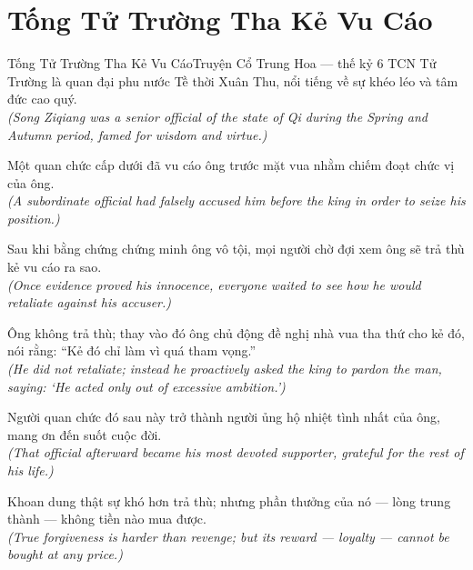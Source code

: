 \section{Tống Tử Trường Tha Kẻ Vu Cáo}
\begin{truyen}{Tống Tử Trường Tha Kẻ Vu Cáo}{Truyện Cổ Trung Hoa --- thế kỷ 6 TCN}
 Tử Trường là quan đại phu nước Tề thời Xuân Thu, nổi tiếng về sự khéo léo và tâm đức cao quý.\\[4pt]
\textit{(Song Ziqiang was a senior official of the state of Qi during the Spring and Autumn period, famed for wisdom and virtue.)}

Một quan chức cấp dưới đã vu cáo ông trước mặt vua nhằm chiếm đoạt chức vị của ông.\\[4pt]
\textit{(A subordinate official had falsely accused him before the king in order to seize his position.)}

Sau khi bằng chứng chứng minh ông vô tội, mọi người chờ đợi xem ông sẽ trả thù kẻ vu cáo ra sao.\\[4pt]
\textit{(Once evidence proved his innocence, everyone waited to see how he would retaliate against his accuser.)}

Ông không trả thù; thay vào đó ông chủ động đề nghị nhà vua tha thứ cho kẻ đó, nói rằng: ``Kẻ đó chỉ làm vì quá tham vọng.''\\[4pt]
\textit{(He did not retaliate; instead he proactively asked the king to pardon the man, saying: `He acted only out of excessive ambition.')}

Người quan chức đó sau này trở thành người ủng hộ nhiệt tình nhất của ông, mang ơn đến suốt cuộc đời.\\[4pt]
\textit{(That official afterward became his most devoted supporter, grateful for the rest of his life.)}

\end{truyen}
\begin{baihoc}
  Khoan dung thật sự khó hơn trả thù; nhưng phần thưởng của nó --- lòng trung thành --- không tiền nào mua được.\\[4pt]
  \textit{(True forgiveness is harder than revenge; but its reward --- loyalty --- cannot be bought at any price.)}
\end{baihoc}

